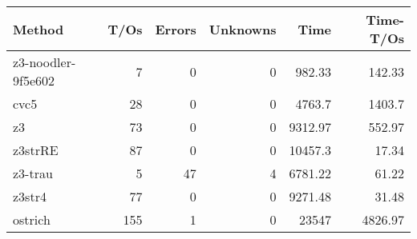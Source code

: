 \begin{tabular}{lrrrrr}
\hline
 Method             &   T/Os &   Errors &   Unknowns &     Time &   Time-T/Os \\
\hline
 z3-noodler-9f5e602 &      7 &        0 &          0 &   982.33 &      142.33 \\
 cvc5               &     28 &        0 &          0 &  4763.7  &     1403.7  \\
 z3                 &     73 &        0 &          0 &  9312.97 &      552.97 \\
 z3strRE            &     87 &        0 &          0 & 10457.3  &       17.34 \\
 z3-trau            &      5 &       47 &          4 &  6781.22 &       61.22 \\
 z3str4             &     77 &        0 &          0 &  9271.48 &       31.48 \\
 ostrich            &    155 &        1 &          0 & 23547    &     4826.97 \\
\hline
\end{tabular}

